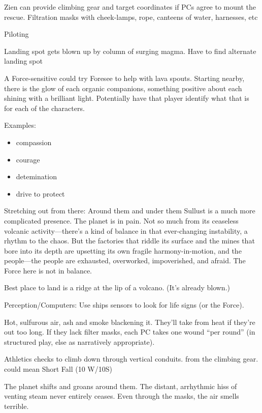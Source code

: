 \documentclass{book}
\begin{document}
Zien can provide climbing gear and target coordinates if PCs agree to mount the rescue. Filtration masks with cheek-lamps, rope, canteens of water, harnesses, etc


\difficulty\difficulty\setback\setback Piloting

\threat \threat Landing spot gets blown up by column of surging magma. Have to find alternate landing spot

A Force-sensitive could try Foresee to help with lava spouts. Starting nearby, there is the glow of each organic companions, something positive about each shining with a brilliant light. Potentially have that player identify what that is for each of the characters.

Examples:
\begin{itemize}
    \item compassion
    \item courage
    \item detemination
    \item drive to protect
\end{itemize}

Stretching out from there: Around them and under them Sullust is a much more complicated presence. The planet is in pain. Not so much from its ceaseless volcanic activity—there’s a kind of balance in that ever-changing instability, a rhythm to the chaos. But the factories that riddle its surface and the mines that bore into its depth are upsetting its own fragile harmony-in-motion, and the people—the people are exhausted, overworked, impoverished, and afraid. The Force here is not in balance.


Best place to land is a ridge at the lip of a volcano. (It’s already blown.)

\difficulty\difficulty\difficulty\setback Perception/Computers: Use ships sensors to look for life signs (or the Force).

Hot, sulfurous air, ash and smoke blackening it. They’ll take \setback\setback from heat if they’re out too long.  If they lack filter masks, each PC takes one wound ``per round'' (in structured play, else as narratively appropriate).

\difficulty\difficulty\difficulty Athletics checks to climb down through vertical conduits. \boost from the climbing gear.  \failure could mean Short Fall (10 W/10S)

The planet shifts and groans around them. The distant, arrhythmic hiss of venting steam never entirely ceases. Even through the masks, the air smells terrible.
\end{document}
